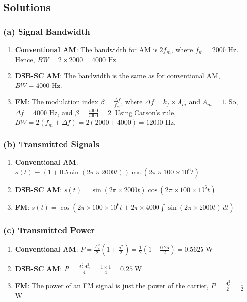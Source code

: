 \documentclass{article}
\begin{document}
\subsection*{Solutions}

\subsubsection*{(a) Signal Bandwidth}

\begin{enumerate}
    \item \textbf{Conventional AM}: The bandwidth for AM is \(2f_m\), where \(f_m = 2000 \) Hz. Hence, \(BW = 2 \times 2000 = 4000 \) Hz.
    \item \textbf{DSB-SC AM}: The bandwidth is the same as for conventional AM, \(BW = 4000 \) Hz.
    \item \textbf{FM}: The modulation index \( \beta = \frac{\Delta f}{f_m} \), where \( \Delta f = k_f \times A_m \) and \( A_m = 1 \). So, \( \Delta f = 4000 \) Hz, and \( \beta = \frac{4000}{2000} = 2 \). Using Carson's rule, \( BW = 2(f_m + \Delta f) = 2(2000 + 4000) = 12000 \) Hz.
\end{enumerate}

\subsubsection*{(b) Transmitted Signals}

\begin{enumerate}
    \item \textbf{Conventional AM}: \( s(t) = (1 + 0.5 \sin(2\pi \times 2000 t)) \cos(2\pi \times 100 \times 10^6 t) \)
    \item \textbf{DSB-SC AM}: \( s(t) = \sin(2\pi \times 2000 t) \cos(2\pi \times 100 \times 10^6 t) \)
    \item \textbf{FM}: \( s(t) = \cos(2\pi \times 100 \times 10^6 t + 2\pi\times4000 \int \sin(2\pi \times 2000 t) \, dt) \)
\end{enumerate}

\subsubsection*{(c) Transmitted Power}

\begin{enumerate}
    \item \textbf{Conventional AM}: \( P = \frac{A_c^2}{2} (1 + \frac{a^2}{2}) = \frac{1}{2}(1 + \frac{0.25}{2}) = 0.5625 \) W
    \item \textbf{DSB-SC AM}: \( P = \frac{A_c^2 A_m^2}{4} = \frac{1 \times 1}{4} = 0.25 \) W
    \item \textbf{FM}: The power of an FM signal is just the power of the carrier, \( P = \frac{A_c^2}{2} = \frac{1}{2} \) W
\end{enumerate}
\end{document}
